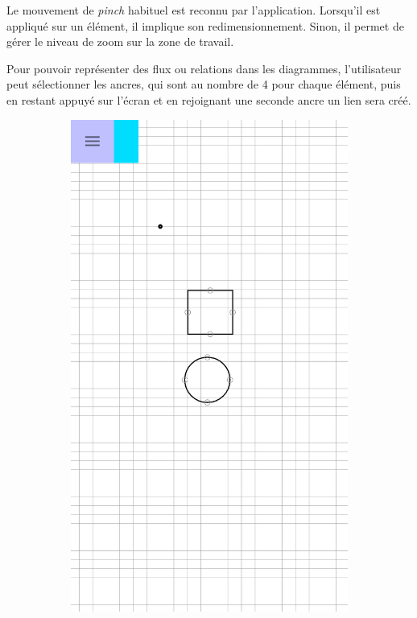 Le mouvement de \textit{pinch} habituel est reconnu par l'application. Lorsqu'il est appliqué sur un élément, il implique son redimensionnement. Sinon, il permet de gérer le niveau de zoom sur la zone de travail.

Pour pouvoir représenter des flux ou relations dans les diagrammes, l'utilisateur peut sélectionner les ancres, qui sont au nombre de 4 pour chaque élément, puis en restant appuyé sur l'écran et en rejoignant une seconde ancre un lien sera créé.

	\vspace*{\fill}
		\begin{figure}[!h]
			\centering
			\begin{subfigure}[t]{.27\textwidth}
				\includegraphics[width=\textwidth]{img/screen/colladia_draw_view_zoom_out}

\end{subfigure}
\end{figure}
